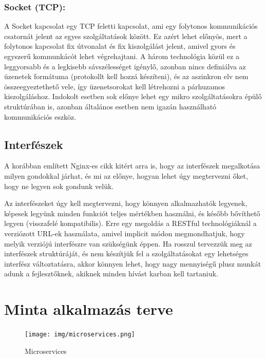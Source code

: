 \documentclass[11pt,magyar,a4paper,oneside,]{report}
\begin{document}
\subsection{Socket (TCP)\citep{socket}:}\label{socket-tcpsocket}

A Socket kapcsolat egy TCP feletti kapcsolat, ami egy folytonos
kommunikációs csatornát jelent az egyes szolgáltatások között. Ez azért
lehet előnyös, mert a folytonos kapcsolat fix útvonalat és fix
kiszolgálást jelent, amivel gyors és egyszerű kommunkácót lehet
végrehajtani. A három technológia közül ez a leggyorsabb és a legkisebb
sávszélességet igénylő, azonban nincs definiálva az üzenetek formátuma
(protokollt kell hozzá készíteni), és az aszinkron elv nem
összeegyeztethető vele, így üzenetsorokat kell létrehozni a párhuzamos
kiszolgáláshoz. Indokolt esetben sok előnye lehet egy mikro
szolgáltatásokra épülő struktúrában is, azonban általános esetben nem
igazán használható kommunikációs eszköz.

\section{Interfészek}\label{interfuxe9szek}

A korábban említett Nginx-es cikk\citep{micro-communication} kitért arra
is, hogy az interfészek megalkotása milyen gondokkal járhat, és mi az
előnye, hogyan lehet úgy megtervezni őket, hogy ne legyen sok gondunk
velük.

Az interfészeket úgy kell megtervezni, hogy könnyen alkalmazhatók
legyenek, képesek legyünk minden funkciót teljes mértékben használni, és
később bővíthető legyen (visszafelé kompatibilis). Erre egy megoldás a
RESTful technológiáknál a verziózott URL-ek használata, amivel implicit
módon megmondhatjuk, hogy melyik verziójú interfészre van szükségünk
éppen. Ha rosszul tervezzük meg az interfészek struktúráját, és nem
készítjük fel a szolgáltatásokat egy lehetséges interfész változtatásra,
akkor könnyen lehet, hogy nagy mennyiségű plusz munkát adunk a
fejlesztőknek, akiknek minden hívást karban kell tartaniuk.

\chapter{Minta alkalmazás terve}\label{minta-alkalmazuxe1s-terve}

\begin{figure}[htbp]
\centering
\texttt{[image: img/microservices.png]}
\caption{Microservices}
\end{figure}
\end{document}
